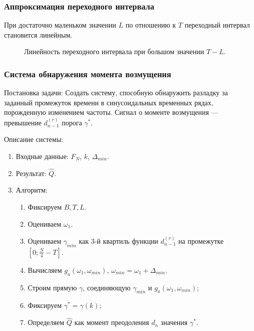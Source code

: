 \documentclass[pdf, 9pt,intlimits, unicode]{beamer}
\begin{document}
	\begin{frame}
		\frametitle{Аппроксимация переходного интервала}
		При достаточно маленьком значении $ L $ по отношению к $ T $ переходный интервал становится линейным.
		
		\begin{figure}[!hhh]
			\caption{Линейность переходного интервала при большом значении $ T-L $.}
			\label{pic:row_linear_growth}
		\end{figure}
	\end{frame}
	
	\begin{frame}
		\frametitle{Система обнаружения момента возмущения}
		{\color{blue} Постановка задачи:}
		Создать систему, способную обнаружить разладку за заданный промежуток времени в синусоидальных временных рядах, порожденную изменением частоты. Сигнал о моменте возмущения --- превышение $ d_{n-1}^{(r)} $ порога $ \gamma^* $.
		
		\bigskip
		{\color{blue} Описание системы:}
		\begin{enumerate}
			\item Входные данные: $ F_N $, $ k $, $ \Delta_{min} $.
			\item Результат: $ \hat{Q}$.
			\item Алгоритм:
			\begin{enumerate}
				\item Фиксируем $ B, T, L $.
				\item Оцениваем $ \omega_1 $.
				\item Оцениваем $ \gamma_{min} $ как $ 3 $-й квартиль  функции $ d_{n-1}^{(r)} $ на промежутке $ [0; \frac{N}{4} - T] $.
				\item Вычисляем $ g_a(\omega_1, \omega_{min}) $, $ \omega_{min} = \omega_1 + \Delta_{min} $.
				\item Строим прямую $ \gamma $, соединяющую $ \gamma_{min} $ и $ g_a(\omega_1, \omega_{min}) $;
				\item Фиксируем $ \gamma^* = \gamma(k) $;
				\item Определяем $ \hat{Q} $ как момент преодоления $ d_n $ значения $ \gamma^* $.
			\end{enumerate}
		\end{enumerate}
	\end{frame}
\end{document}
